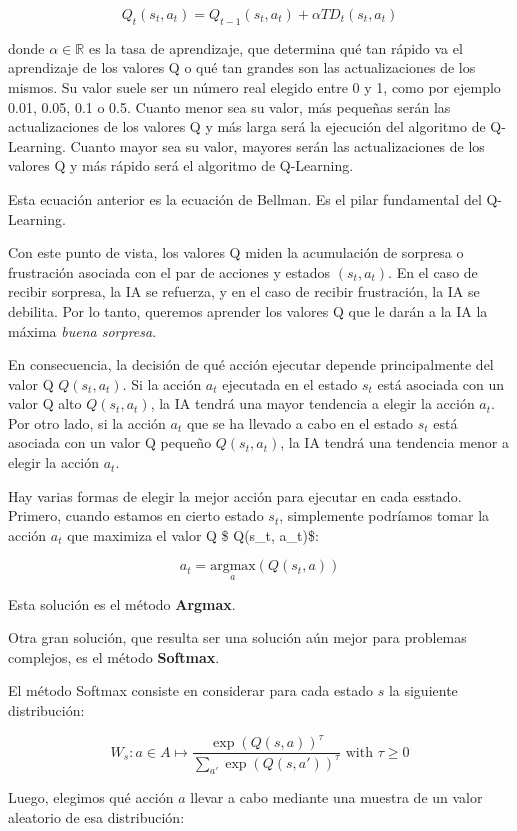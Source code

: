\documentclass[
]{book}
\begin{document}
\[Q_t(s_t,a_t) = Q_{t-1}(s_t,a_t) + \alpha TD_t(s_t,a_t)\]

donde \(\alpha \in \mathbb{R}\) es la tasa de aprendizaje, que determina qué tan rápido va el aprendizaje de los valores Q o qué tan grandes son las actualizaciones de los mismos. Su valor suele ser un número real elegido entre 0 y 1, como por ejemplo 0.01, 0.05, 0.1 o 0.5. Cuanto menor sea su valor, más pequeñas serán las actualizaciones de los valores Q y más larga será la ejecución del algoritmo de Q-Learning. Cuanto mayor sea su valor, mayores serán las actualizaciones de los valores Q y más rápido será el algoritmo de Q-Learning.

Esta ecuación anterior es la ecuación de Bellman. Es el pilar fundamental del Q-Learning.

Con este punto de vista, los valores Q miden la acumulación de sorpresa o frustración asociada con el par de acciones y estados \((s_t, a_t)\). En el caso de recibir sorpresa, la IA se refuerza, y en el caso de recibir frustración, la IA se debilita. Por lo tanto, queremos aprender los valores Q que le darán a la IA la máxima \emph{buena sorpresa}.

En consecuencia, la decisión de qué acción ejecutar depende principalmente del valor Q \(Q(s_t, a_t)\). Si la acción \(a_t\) ejecutada en el estado \(s_t\) está asociada con un valor Q alto \(Q (s_t, a_t)\), la IA tendrá una mayor tendencia a elegir la acción \(a_t\). Por otro lado, si la acción \(a_t\) que se ha llevado a cabo en el estado \(s_t\) está asociada con un valor Q pequeño \(Q(s_t, a_t)\), la IA tendrá una tendencia menor a elegir la acción \(a_t\).

Hay varias formas de elegir la mejor acción para ejecutar en cada esstado. Primero, cuando estamos en cierto estado \(s_t\), simplemente podríamos tomar la acción \(a_t\) que maximiza el valor Q \$ Q(s\_t, a\_t)\$:

\[a_t = \underset{a}{\textrm{argmax}}(Q(s_t,a))\]

Esta solución es el método \textbf{Argmax}.

Otra gran solución, que resulta ser una solución aún mejor para problemas complejos, es el método \textbf{Softmax}.

El método Softmax consiste en considerar para cada estado \(s\) la siguiente distribución:

\[W_s: a \in A \mapsto \frac{\exp(Q(s,a))^{\tau}}{\sum_{a'}\exp(Q(s,a'))^{\tau}} \textrm{ with } \tau \ge 0\]

Luego, elegimos qué acción \(a\) llevar a cabo mediante una muestra de un valor aleatorio de esa distribución:
\end{document}
